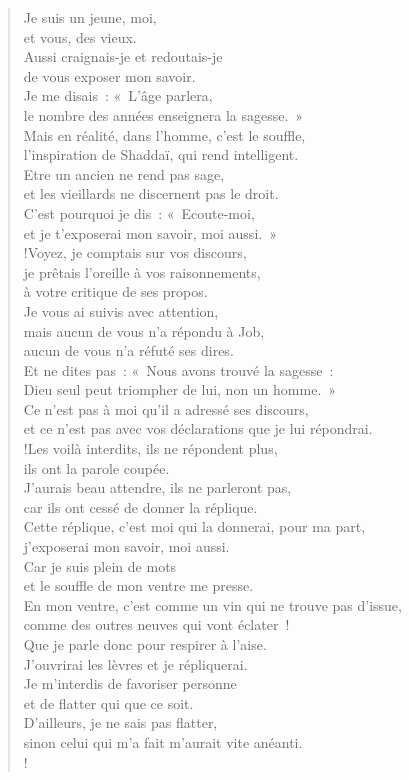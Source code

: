 \documentclass[french,twoside]{book} %
\newcommand\chapterclose{} %
\begin{document}
\begin{verse}
Je suis un jeune, moi, \\
et vous, des vieux. \\
Aussi craignais-je et redoutais-je \\
de vous exposer mon savoir.\\
Je me disais : « L’âge parlera, \\
le nombre des années enseignera la sagesse. »\\
Mais en réalité, dans l’homme, c’est le souffle, \\
l’inspiration de Shaddaï, qui rend intelligent.\\
Etre un ancien ne rend pas sage, \\
et les vieillards ne discernent pas le droit.\\
C’est pourquoi je dis : « Ecoute-moi, \\
et je t’exposerai mon savoir, moi aussi. »\\!Voyez, je comptais sur vos discours, \\
je prêtais l’oreille à vos raisonnements, \\
à votre critique de ses propos.\\
Je vous ai suivis avec attention, \\
mais aucun de vous n’a répondu à Job, \\
aucun de vous n’a réfuté ses dires.\\
Et ne dites pas : « Nous avons trouvé la sagesse : \\
Dieu seul peut triompher de lui, non un homme. »\\
Ce n’est pas à moi qu’il a adressé ses discours, \\
et ce n’est pas avec vos déclarations que je lui répondrai.\\!Les voilà interdits, ils ne répondent plus, \\
ils ont la parole coupée.\\
J’aurais beau attendre, ils ne parleront pas, \\
car ils ont cessé de donner la réplique.\\
Cette réplique, c’est moi qui la donnerai, pour ma part, \\
j’exposerai mon savoir, moi aussi.\\
Car je suis plein de mots \\
et le souffle de mon ventre me presse.\\
En mon ventre, c’est comme un vin qui ne trouve pas d’issue, \\
comme des outres neuves qui vont éclater !\\
Que je parle donc pour respirer à l’aise. \\
J’ouvrirai les lèvres et je répliquerai.\\
Je m’interdis de favoriser personne \\
et de flatter qui que ce soit.\\
D’ailleurs, je ne sais pas flatter, \\
sinon celui qui m’a fait m’aurait vite anéanti.\\!
\end{verse}
\chapterclose
\end{document}
